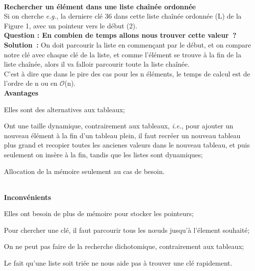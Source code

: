 \documentclass[hidelinks,a4paper,12pt]{article}
\begin{document}
~\\
\textbf {Rechercher un élément dans une liste chaînée ordonnée} \medskip \\
Si on cherche \textit{e.g.}, la derniere clé 36 dans cette liste chaînée ordonnée (L) de la Figure 1, avec un pointeur vers le début (2).\\[0.5cm] 
\textbf {Question : En combien de temps allons nous trouver cette valeur ?}\\
\textbf {Solution :} On doit parcourir la liste en commençant par le début, et on compare notre clé avec chaque clé de la liste, et comme l'élément se trouve à la fin de la liste chaînée, alors il va falloir parcourir toute la liste chaînée. \\ C'est à dire que dans le pire des cas pour les n éléments, le temps de calcul est de l'ordre de n ou en $\mathcal{O}$(n).
\\[0.5cm]

\textbf {Avantages}
\begin{description}[font=$\bullet$~\normalfont\scshape\color{red!50!black}]
	\item Elles sont des alternatives aux tableaux;
	\item Ont une taille dynamique, contrairement aux tableaux, \textit{i.e.}, pour ajouter un nouveau élément à la fin d'un tableau plein, il faut recréer un nouveau tableau plus grand et recopier toutes les ancienes valeurs dans le nouveau tableau, et puis seulement on insère à la fin, tandis que les listes sont dynamiques;
	\item Allocation de la mémoire seulement au cas de besoin.	
\end{description} 
~\\

\textbf {Inconvénients}
\begin{description}[font=$\bullet$~\normalfont\scshape\color{red!50!black}]
\item Elles ont besoin de plus de mémoire pour stocker les pointeurs;
\item Pour chercher une clé, il faut parcourir tous les nœuds jusqu'à l'élement souhaité; 
\item On ne peut pas faire de la recherche dichotomique, contrairement aux tableaux;
\item Le fait qu'une liste soit triée ne nous aide pas à trouver une clé rapidement.
\end{description} 
~\\
\end{document}
